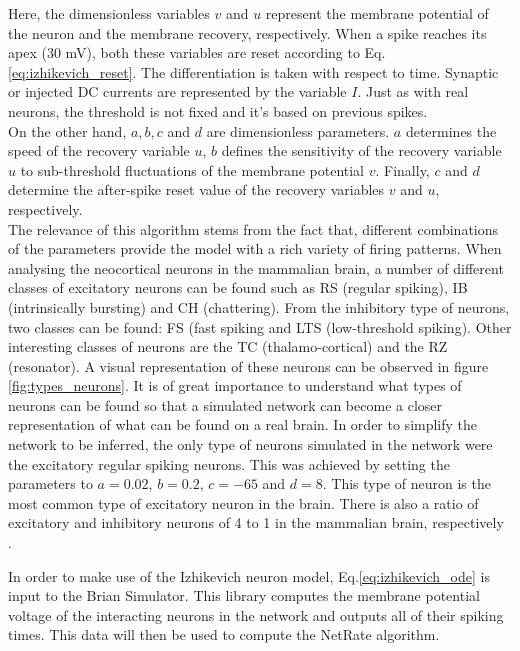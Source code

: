\documentclass[11pt]{article}
\begin{document}
Here, the dimensionless variables $v$ and $u$ represent the membrane potential of the neuron and the membrane recovery, respectively. When a spike reaches its apex (30 mV), both these variables are reset according to Eq. \ref{eq:izhikevich_reset}. The differentiation is taken with respect to time. Synaptic or injected DC currents are represented by the variable $I$. Just as with real neurons, the threshold is not fixed and it's based on previous spikes. 
\\
On the other hand, $a, b, c$ and $d$ are dimensionless parameters. $a$ determines the speed of the recovery variable $u$, $b$ defines the sensitivity of the recovery variable $u$ to sub-threshold fluctuations of the membrane potential $v$. Finally, $c$ and $d$ determine the after-spike reset value of the recovery variables $v$ and $u$, respectively. 
\\
The relevance of this algorithm stems from the fact that, different combinations of the parameters provide the model with a rich variety of firing patterns. When analysing the neocortical neurons in the mammalian brain, a number of different classes of excitatory neurons can be found \cite{connors1990intrinsic, gray1996chattering} such as RS (regular spiking), IB (intrinsically bursting) and CH (chattering). From the inhibitory type of neurons, two classes can be found: FS (fast spiking and LTS (low-threshold spiking). Other interesting classes of neurons are the TC (thalamo-cortical) and the RZ (resonator). A visual representation of these neurons can be observed in figure \ref{fig:types_neurons}. It is of great importance to understand what types of neurons can be found so that a simulated network can become a closer representation of what can be found on a real brain. In order to simplify the network to be inferred, the only type of neurons simulated in the network were the excitatory regular spiking neurons. This was achieved by setting the parameters to $a=0.02$, $b=0.2$, $c=-65$ and $d=8$. This type of neuron is the most common type of excitatory neuron in the brain. There is also a ratio of excitatory and inhibitory neurons of 4 to 1 in the mammalian brain, respectively \cite{izhikevich2003simple}.

In order to make use of the Izhikevich neuron model, Eq.\ref{eq:izhikevich_ode} is input to the Brian Simulator. This library computes the membrane potential voltage of the interacting neurons in the network and outputs all of their spiking times. This data will then be used to compute the NetRate algorithm.
\end{document}
